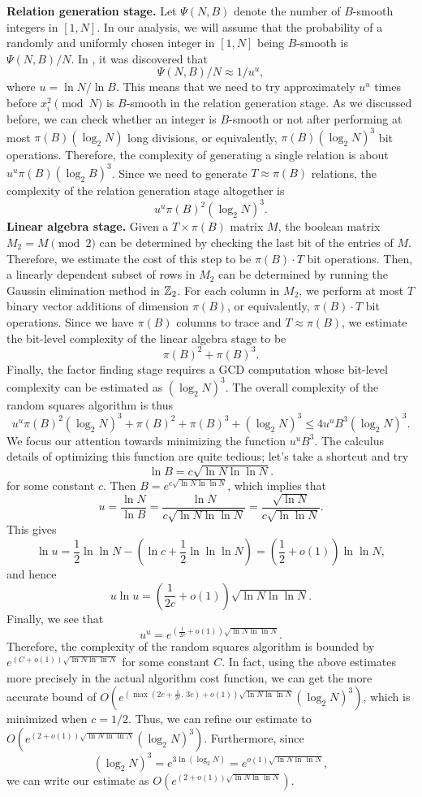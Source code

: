{\bf Relation generation stage.} Let $\Psi(N, B)$ denote the number of 
$B$-smooth integers in $[1, N]$. In our analysis, we will assume that the 
probability of a randomly and uniformly chosen integer in $[1, N]$ being 
$B$-smooth is $\Psi(N, B)/N$. In \cite{CANFIELD19831}, it was discovered that 
\[ \Psi(N,B)/N \approx 1/u^u, \] 
where $u = \ln N/\ln B$. This means that we need to try approximately $u^u$ 
times before $x_i^2 \pmod N$ is $B$-smooth in the relation generation stage. 
As we discussed before, we can check whether an integer is $B$-smooth or 
not after performing at most $\pi(B) (\log_2 N)$ long divisions, or equivalently, 
$\pi(B) (\log_2 N)^3$ bit operations. Therefore, the complexity of generating 
a single relation is about $u^u \pi(B) (\log_2 B)^3$. Since we need to generate 
$T \approx \pi(B)$ relations, the complexity of the relation generation stage 
altogether is 
\[ u^u \pi(B)^2 (\log_2 N)^3. \] 
{\bf Linear algebra stage.} Given a $T \times \pi(B)$ matrix $M$, the boolean 
matrix $M_2 = M \pmod 2$ can be determined by checking the last bit of the 
entries of $M$. Therefore, we estimate the cost of this step to be $\pi(B) 
\cdot T$ bit operations. Then, a linearly dependent subset of rows in $M_2$ 
can be determined by running the Gaussin elimination method in $\mathbb{Z}_2$. 
For each column in $M_2$, we perform at most $T$ binary vector additions 
of dimension $\pi(B)$, or equivalently, $\pi(B) \cdot T$ bit operations. 
Since we have $\pi(B)$ columns to trace and $T \approx \pi(B)$, we estimate 
the bit-level complexity of the linear algebra stage to be 
\[ \pi(B)^2 + \pi(B)^3. \] 
Finally, the factor finding stage requires a GCD computation whose bit-level 
complexity can be estimated as $(\log_2 N)^3$. The overall complexity of the 
random squares algorithm is thus 
\[ u^u \pi(B)^2 (\log_2 N)^3 + \pi(B)^2 + \pi(B)^3 + (\log_2 N)^3 
\leq 4u^u B^3 (\log_2 N)^3. \] 
We focus our attention towards minimizing the function $u^u B^3$. The calculus 
details of optimizing this function are quite tedious; let's take a shortcut 
and try 
\[ \ln B = c\sqrt{\ln N \ln\ln N}. \] 
for some constant $c$. Then $B = e^{c\sqrt{\ln N \ln\ln N}}$, which implies that 
\[ u = \frac{\ln N}{\ln B} = \frac{\ln N}{c\sqrt{\ln N \ln\ln N}} = 
\frac{\sqrt{\ln N}}{c\sqrt{\ln \ln N}}. \] 
This gives 
\[ \ln u = \frac12 \ln\ln N - \left( \ln c + \frac12 \ln\ln\ln N \right) 
= \left( \frac12 + o(1) \right) \ln\ln N, \] 
and hence 
\[ u\ln u = \left( \frac1{2c} + o(1) \right) \sqrt{\ln N \ln\ln N}. \] 
Finally, we see that 
\[ u^u = e^{(\frac1{2c} + o(1)) \sqrt{\ln N \ln\ln N}}. \] 
Therefore, the complexity of the random squares algorithm is bounded by 
$e^{(C + o(1)) \sqrt{\ln N \ln\ln N}}$
for some constant $C$. In fact, using the above estimates more precisely in the 
actual algorithm cost function, we can get the more accurate bound of 
$O(e^{(\max(2c + \frac{1}{2c},\,3c) + o(1)) \sqrt{\ln N \ln\ln N}} (\log_2 N)^3)$,
which is minimized when $c = 1/2$. Thus, we can refine our estimate to 
$O( e^{(2 + o(1)) \sqrt{ \ln N \ln\ln N}} (\log_2 N)^3)$. 
Furthermore, since 
\[ (\log_2 N)^3 = e^{3\ln(\log_2 N)} = e^{o(1) \sqrt{\ln N \ln\ln N}}, \] 
we can write our estimate as $O(e^{(2+o(1))\sqrt{\ln N \ln\ln N}})$. 

